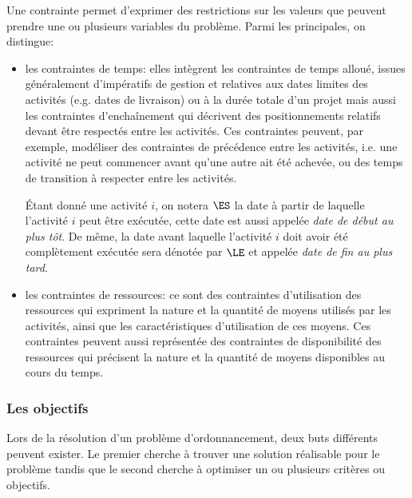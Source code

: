 Une contrainte permet d'exprimer des restrictions sur les valeurs que
peuvent prendre une ou plusieurs variables du problème. Parmi les
principales, on distingue:
\begin{itemize}
\item les contraintes de temps: elles intègrent les contraintes de
  temps alloué, issues généralement d'impératifs de gestion et
  relatives aux dates limites des activités (e.g. dates
    de livraison) ou à la durée totale d'un projet mais aussi les
    contraintes d'enchaînement qui décrivent des
    positionnements relatifs devant être respectés entre les
    activités. Ces contraintes peuvent, par exemple, modéliser des
    contraintes de précédence entre les activités, i.e. une activité
    ne peut commencer avant qu'une autre ait été achevée, ou des temps
    de transition à respecter entre les activités.

    {\'E}tant donné une activité $i$, on notera $\ES$ la date à partir
de laquelle l'activité $i$ peut être exécutée, cette date est aussi
appelée {\it date de début au plus tôt}. De même, la date avant
laquelle l'activité $i$ doit avoir été complètement exécutée sera
dénotée par $\LE$ et appelée {\it date de fin au plus tard}.

\item les contraintes de ressources:  ce sont des contraintes d'utilisation
  des ressources qui expriment la nature et la quantité de moyens
  utilisés par les activités, ainsi que les caractéristiques
  d'utilisation de ces moyens. Ces contraintes peuvent aussi représentée
  des contraintes de disponibilité des ressources qui précisent la
  nature et la quantité de moyens disponibles au cours du temps.
\end{itemize}

\subsubsection{Les objectifs}

Lors de la résolution d'un problème d'ordonnancement, deux buts
différents peuvent exister. Le premier cherche à trouver une solution
réalisable pour le problème tandis que le second cherche à optimiser
un ou plusieurs critères ou objectifs. 


